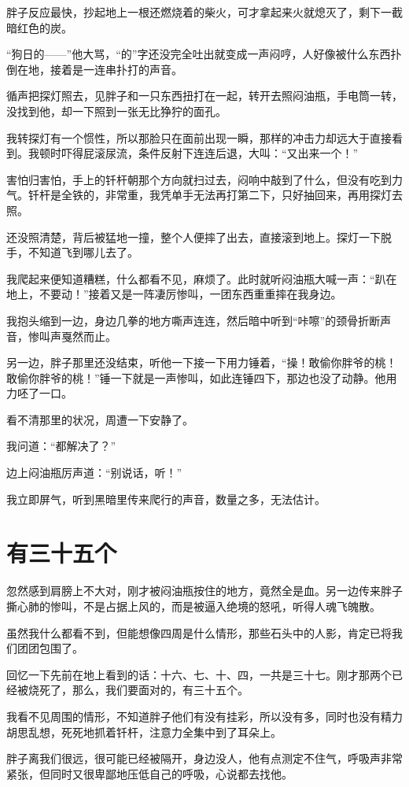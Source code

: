 胖子反应最快，抄起地上一根还燃烧着的柴火，可才拿起来火就熄灭了，剩下一截暗红色的炭。

“狗日的——”他大骂，“的”字还没完全吐出就变成一声闷哼，人好像被什么东西扑倒在地，接着是一连串扑打的声音。

循声把探灯照去，见胖子和一只东西扭打在一起，转开去照闷油瓶，手电筒一转，没找到他，却一下照到一张无比狰狞的面孔。

我转探灯有一个惯性，所以那脸只在面前出现一瞬，那样的冲击力却远大于直接看到。我顿时吓得屁滚尿流，条件反射下连连后退，大叫：“又出来一个！”

害怕归害怕，手上的钎杆朝那个方向就扫过去，闷响中敲到了什么，但没有吃到力气。钎杆是全铁的，非常重，我凭单手无法再打第二下，只好抽回来，再用探灯去照。

还没照清楚，背后被猛地一撞，整个人便摔了出去，直接滚到地上。探灯一下脱手，不知道飞到哪儿去了。

我爬起来便知道糟糕，什么都看不见，麻烦了。此时就听闷油瓶大喊一声：“趴在地上，不要动！”接着又是一阵凄厉惨叫，一团东西重重摔在我身边。

我抱头缩到一边，身边几拳的地方嘶声连连，然后暗中听到“咔嚓”的颈骨折断声音，惨叫声戛然而止。

另一边，胖子那里还没结束，听他一下接一下用力锤着，“操！敢偷你胖爷的桃！敢偷你胖爷的桃！”锤一下就是一声惨叫，如此连锤四下，那边也没了动静。他用力呸了一口。

看不清那里的状况，周遭一下安静了。

我问道：“都解决了？”

边上闷油瓶厉声道：“别说话，听！”

我立即屏气，听到黑暗里传来爬行的声音，数量之多，无法估计。

\chapter{有三十五个}

忽然感到肩膀上不大对，刚才被闷油瓶按住的地方，竟然全是血。另一边传来胖子撕心肺的惨叫，不是占据上风的，而是被逼入绝境的怒吼，听得人魂飞魄散。

虽然我什么都看不到，但能想像四周是什么情形，那些石头中的人影，肯定已将我们团团包围了。

回忆一下先前在地上看到的话：十六、七、十、四，一共是三十七。刚才那两个已经被烧死了，那么，我们要面对的，有三十五个。

我看不见周围的情形，不知道胖子他们有没有挂彩，所以没有多，同时也没有精力胡思乱想，死死地抓着钎杆，注意力全集中到了耳朵上。

胖子离我们很远，很可能已经被隔开，身边没人，他有点测定不住气，呼吸声非常紧张，但同时又很卑鄙地压低自己的呼吸，心说都去找他。

